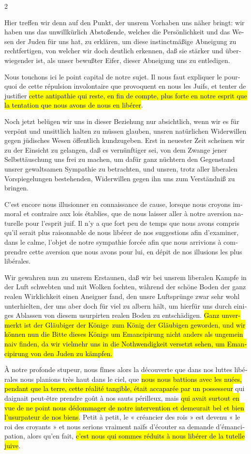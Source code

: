 \documentclass[a4paper,12pt]{article}
\newcommand\chunks[2]{%
\begin{leftcolumn*}\begin{otherlanguage}{german}%
{#1}%
\end{otherlanguage}\end{leftcolumn*}%
\begin{rightcolumn}\begin{otherlanguage}{french}%
{#2}%
\end{otherlanguage}\end{rightcolumn}%
}
\begin{document}
\begin{paracol}{2}
  \chunks{Hier treffen wir denn auf den Punkt, der unsrem Vorhaben uns näher bringt: wir haben uns das unwillkürlich Abstoßende, welches die Persönlichkeit und das Wesen der Juden für uns hat, zu erklären, um diese instinctmäßige Abneigung zu rechtfertigen, von welcher wir doch deutlich erkennen, daß sie stärker und überwiegender ist, als unser bewußter Eifer, dieser Abneigung uns zu entledigen.}
         {Nous touchons ici le point capital de notre sujet. Il nous faut expliquer le pourquoi de cette répulsion involontaire que provoquent en nous les Juifs, et tenter de justifier \hl{cette antipathie qui reste, en fin de compte, plus forte en notre esprit que la tentation que nous avons de nous en libérer}.}
  \chunks{Noch jetzt belügen wir uns in dieser Beziehung nur absichtlich, wenn wir es für verpönt und unsittlich halten zu müssen glauben, unsren natürlichen Widerwillen gegen jüdisches Wesen öffentlich kundzugeben. Erst in neuester Zeit scheinen wir zu der Einsicht zu gelangen, daß es vernünftiger sei, von dem Zwange jener Selbsttäuschung uns frei zu machen, um dafür ganz nüchtern den Gegenstand unsrer gewaltsamen Sympathie zu betrachten, und unsren, trotz aller liberalen Vorspiegelungen bestehenden, Widerwillen gegen ihn uns zum Verständniß zu bringen.}
         {C’est encore nous illusionner en connaissance de cause, lorsque nous croyons immoral et contraire aux lois établies, que de nous laisser aller à notre aversion naturelle pour l’esprit juif. Il n’y a que fort peu de temps que nous avons compris qu’il serait plus raisonnable de nous libérer de nos suggestions afin d’examiner, dans le calme, l’objet de notre sympathie forcée afin que nous arrivions à comprendre cette aversion que nous avons pour lui, en dépit de nos illusions les plus libérales.}
  \chunks{Wir gewahren nun zu unsrem Erstaunen, daß wir bei unsrem liberalen Kampfe in der Luft schwebten und mit Wolken fochten, während der schöne Boden der ganz realen Wirklichkeit einen Aneigner fand, den unsre Luftsprünge zwar sehr wohl unterhielten, der uns aber doch für viel zu albern hält, um hierfür uns durch einiges Ablassen von diesem usurpirten realen Boden zu entschädigen. \hl{Ganz unvermerkt ist der \glqq Gläubiger der Könige\grqq\ zum König der Gläubigen geworden, und wir können nun die Bitte dieses Königs um Emancipirung nicht anders als ungemein naiv finden, da wir vielmehr uns in die Nothwendigkeit versetzt sehen, um Emancipirung von den Juden zu kämpfen.}}
         {À notre profonde stupeur, nous fîmes alors la découverte que dans nos luttes libérales nous planions très haut dans le ciel, que \hl{nous nous battions avec les nuées, pendant que la terre, cette réalité tangible, était accaparée par un possesseur} qui daignait peut-être prendre goût à nos sauts périlleux, mais \hl{qui avait surtout en vue de ne point nous dédommager de notre intervention et demeurait bel et bien l’usurpateur de nos biens}. Petit à petit, le « créancier des rois » est devenu « le roi des croyants » et nous serions vraiment naïfs d’écouter sa demande d’émancipation, alors qu’en fait, \hl{c’est nous qui sommes réduits à nous libérer de la tutelle juive}.}

\end{paracol}
\end{document}
